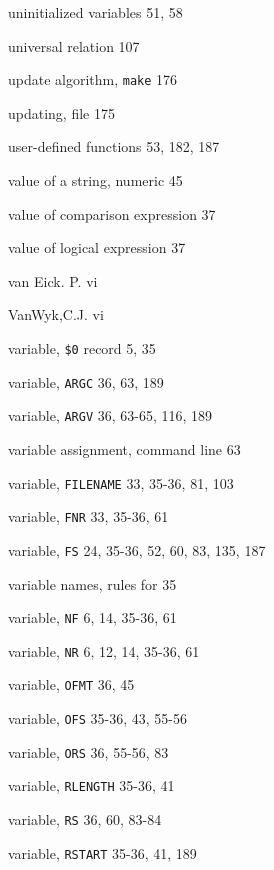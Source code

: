 \begin{multicols}{3}
\hangindent=3pc  uninitialized variables 51, 58

\hangindent=3pc  universal relation 107

\hangindent=3pc  update algorithm, \verb'make' 176

\hangindent=3pc  updating, file 175

\hangindent=3pc  user-defined functions 53, 182,  187

\hangindent=3pc  value of a string, numeric 45

\hangindent=3pc  value of comparison expression 37

\hangindent=3pc  value of logical expression 37

\hangindent=3pc  van Eick. P. vi

\hangindent=3pc  VanWyk,C.J. vi

\hangindent=3pc  variable, \verb'$0' record 5, 35

\hangindent=3pc  variable, \verb'ARGC' 36, 63, 189

\hangindent=3pc  variable, \verb'ARGV' 36, 63-65, 116, 189

\hangindent=3pc  variable assignment, command line 63

\hangindent=3pc  variable, \verb'FILENAME' 33, 35-36, 81, 103

\hangindent=3pc  variable, \verb'FNR' 33, 35-36, 61

\hangindent=3pc  variable, \verb'FS' 24, 35-36, 52, 60, 83, 135, 187

\hangindent=3pc  variable names, rules for 35

\hangindent=3pc  variable, \verb'NF' 6, 14, 35-36, 61

\hangindent=3pc  variable, \verb'NR' 6, 12, 14, 35-36, 61

\hangindent=3pc  variable, \verb'OFMT' 36, 45

\hangindent=3pc  variable, \verb'OFS' 35-36, 43, 55-56

\hangindent=3pc  variable, \verb'ORS' 36, 55-56, 83

\hangindent=3pc  variable, \verb'RLENGTH' 35-36, 41

\hangindent=3pc  variable, \verb'RS' 36, 60, 83-84

\hangindent=3pc  variable, \verb'RSTART' 35-36, 41, 189


\end{multicols}
